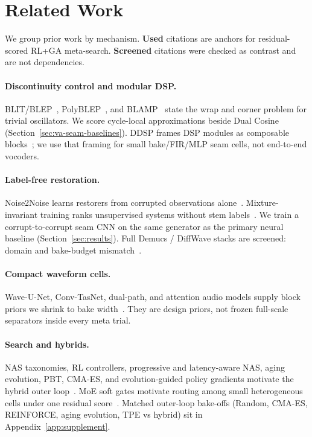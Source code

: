 \section{Related Work}
\label{sec:related_work}

We group prior work by mechanism.
\textbf{Used} citations are anchors for residual-scored RL+GA meta-search.
\textbf{Screened} citations were checked as contrast and are not dependencies.

\paragraph{Discontinuity control and modular DSP.}
BLIT/BLEP~\cite{stilson1996}, PolyBLEP~\cite{nam2009polyblep}, and BLAMP~\cite{esqueda2016blamp} state the wrap and corner problem for trivial oscillators.
We score cycle-local approximations beside Dual Cosine (Section~\ref{sec:va-seam-baselines}).
DDSP frames DSP modules as composable blocks~\cite{engel2020}; we use that framing for small bake/FIR/MLP seam cells, not end-to-end vocoders.

\paragraph{Label-free restoration.}
Noise2Noise learns restorers from corrupted observations alone~\cite{lehtinen2018,kashyap2021n2n}.
Mixture-invariant training ranks unsupervised systems without stem labels~\cite{wisdom2020}.
We train a corrupt-to-corrupt seam CNN on the same generator as the primary neural baseline (Section~\ref{sec:results}).
Full Demucs / DiffWave stacks are screened: domain and bake-budget mismatch~\cite{dfossez2019,kong2021}.

\paragraph{Compact waveform cells.}
Wave-U-Net, Conv-TasNet, dual-path, and attention audio models supply block priors we shrink to bake width~\cite{stoller2018,luo2019,luo2020dprnn,subakan2021,ronneberger2015,he2016resnet,vaswani2017}.
They are design priors, not frozen full-scale separators inside every meta trial.

\paragraph{Search and hybrids.}
NAS taxonomies, RL controllers, progressive and latency-aware NAS, aging evolution, PBT, CMA-ES, and evolution-guided policy gradients motivate the hybrid outer loop~\cite{elsken2019,zoph2017nas,pham2018,liu2018pnas,tan2019mnasnet,real2019,jaderberg2017,hansen2016cmaes,khadka2018,schulman2017}.
MoE soft gates motivate routing among small heterogeneous cells under one residual score~\cite{shazeer2017}.
Matched outer-loop bake-offs (Random, CMA-ES, REINFORCE, aging evolution, TPE vs hybrid) sit in Appendix~\ref{app:supplement}.

